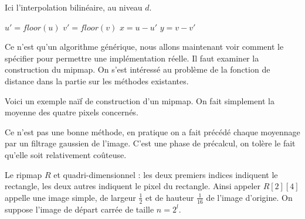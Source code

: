 \medbreak
\medbreak
Ici l'interpolation bilinéaire, au niveau $d$.
\medbreak
\medbreak

\begin{algorithm}[H]
\caption{$bilinearMipMap(u,v,M)$}
$u'=floor(u)$\;
$v' = floor(v)$\;
$x=u-u'$\;
$y = v-v'$\;
\;
\end{algorithm}

\medbreak
\medbreak
Ce n'est qu'un algorithme générique, nous allons maintenant voir comment le spécifier pour permettre une implémentation réelle. Il faut examiner la construction du mipmap. On s'est intéressé au problème de la fonction de distance dans la partie sur les méthodes existantes. %


Voici un exemple naïf de construction d'un mipmap. On fait simplement la moyenne des quatre pixels concernés.
 \medbreak
  \medbreak
 \begin{algorithm}[H]
 \caption{$buildMipMap(*img)$}
 \end{algorithm}
 \medbreak
  \medbreak
 Ce n'est pas une bonne méthode, en pratique on a fait précédé chaque moyennage par un filtrage gaussien de l'image. C'est une phase de précalcul, on tolère le fait qu'elle soit relativement coûteuse.  




Le ripmap $R$ et quadri-dimensionnel  : les deux premiers indices indiquent le rectangle, les deux autres indiquent le pixel du rectangle. Ainsi appeler $R[2][4]$ appelle une image simple, de largeur $\frac{1}{2}$ et de hauteur $\frac{1}{16}$ de l'image d'origine. On suppose l'image de départ carrée de taille $n=2^l$.


